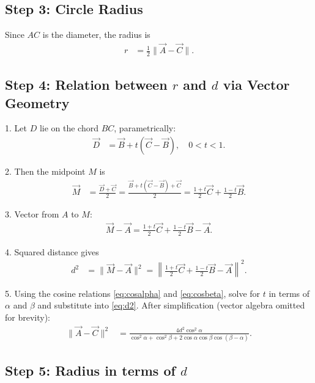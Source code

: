 \documentclass[journal]{IEEEtran}
\begin{document}
\subsection*{Step 3: Circle Radius}

Since $AC$ is the diameter, the radius is
\begin{align}
r &= \frac{1}{2} \|\vec{A}-\vec{C}\|. \label{eq:radius}
\end{align}

\subsection*{Step 4: Relation between $r$ and $d$ via Vector Geometry}

1. Let $D$ lie on the chord $BC$, parametrically:
\begin{align}
\vec{D} &= \vec{B} + t (\vec{C}-\vec{B}), \quad 0 < t < 1. \label{eq:Dparam}
\end{align}

2. Then the midpoint $M$ is
\begin{align}
\vec{M} &= \frac{\vec{D} + \vec{C}}{2} 
= \frac{\vec{B} + t(\vec{C}-\vec{B}) + \vec{C}}{2} 
= \frac{1+t}{2}\vec{C} + \frac{1-t}{2} \vec{B}. \label{eq:Mparam}
\end{align}

3. Vector from $A$ to $M$:
\begin{align}
 \vec{M} - \vec{A} = \frac{1+t}{2}\vec{C} + \frac{1-t}{2} \vec{B} - \vec{A}. \label{eq:AM}
\end{align}

4. Squared distance gives
\begin{align}
d^2 &= \|\vec{M}-\vec{A}\|^2 = \left\| \frac{1+t}{2}\vec{C} + \frac{1-t}{2} \vec{B} - \vec{A} \right\|^2. \label{eq:d2}
\end{align}

5. Using the cosine relations \eqref{eq:cosalpha} and \eqref{eq:cosbeta}, solve for $t$ in terms of $\alpha$ and $\beta$ and substitute into \eqref{eq:d2}.  
After simplification (vector algebra omitted for brevity):
\begin{align}
\|\vec{A}-\vec{C}\|^2 &= \frac{4 d^2 \cos^2 \alpha}{\cos^2 \alpha + \cos^2 \beta + 2 \cos \alpha \cos \beta \cos(\beta-\alpha)}. \label{eq:AC2}
\end{align}

\subsection*{Step 5: Radius in terms of $d$}
\end{document}
